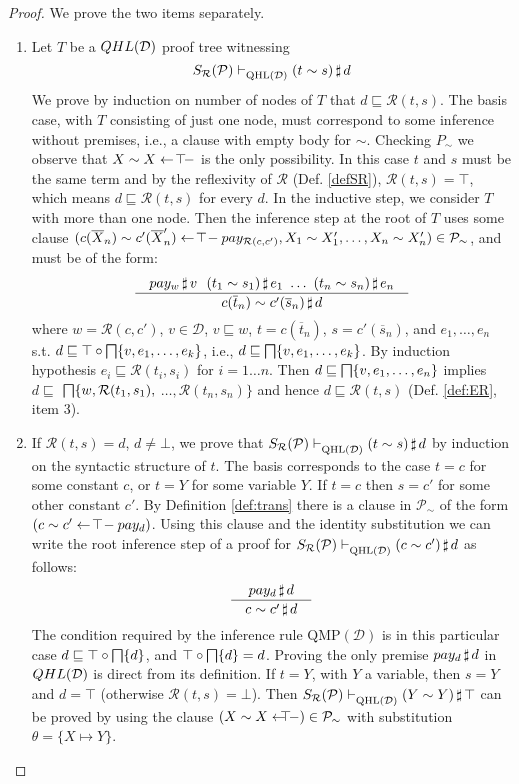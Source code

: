 \documentclass{sigplanconf}
\newcommand{\qdom}{\mathcal{D}} \newcommand{\dqdom}{D \setminus \{\bot\}} \newcommand{\bqdom}{(D \setminus \{\bot\}) \uplus \{?\}}
\newcommand{\simrel}{\mathcal{R}}
\newcommand{\trans}[2]{S_{#1}(#2)}
\newcommand{\Prog}{\mathcal{P}} \newcommand{\UProg}{\mathcal{P_U}}
\theoremstyle{definition}
\theoremstyle{plain}
\begin{document}
\begin{proof} We prove the two items separately.


\begin{enumerate}
    \item Let $T$ be a $\qhl{\qdom}$ proof tree witnessing $$\trans{\simrel}{\Prog} \qhld \at{(t \sim s)}{d}$$ We prove by induction on number of nodes of $T$ that $d \sqsubseteq  \simrel(t,s)$. The basis case, with $T$ consisting of just one node, must correspond to some inference without premises, i.e., a clause with empty body for $\sim$. Checking $P_\sim$ we observe that $X \sim X \gets\!\top\!-$ is the only possibility. In this case $t$ and $s$ must be the same term and by the reflexivity of $\simrel$ (Def. \ref{defSR}), $\simrel(t,s)= \top$, which means $d \sqsubseteq \simrel(t,s)$ for every $d$. In the inductive step, we consider $T$ with more than one node. Then the inference step at the root of $T$ uses some clause $(c(\overline{X}_n) \sim c'(\overline{X}'_n) \qgets{\top}pay_{\simrel(c,c')}, X_1 \sim X'_1, \dots, X_n \sim X'_n) \in \Prog_\sim$, and must be of the form:
        \[ \frac
            {\quad \at{pay_w}{v}\ \ \at{(t_1 \sim s_1)}{e_1}\ \dots \ \at{(t_n \sim s_n)}{e_n} \quad}
            {\at{c(\overline{t}_n) \sim c'(\overline{s}_n)}{d}}
        \]
        where $w=\simrel(c,c')$, $v\in \qdom$, $v \sqsubseteq w$, $t = c(\overline{t}_n)$, $s=c'(\overline{s}_n)$, and $e_1, \dots, e_n$ s.t. $d \sqsubseteq \top \circ \bigsqcap \{v, e_1, \ldots, e_k\}$, i.e., $d \sqsubseteq \bigsqcap\{v, e_1, \ldots, e_k\}$. By induction hypothesis $e_i \sqsubseteq \simrel(t_i,s_i)$ for $i=1 \dots n$. Then $d \sqsubseteq \bigsqcap \{v, e_1, \ldots, e_n\}$ implies $d \sqsubseteq$ $\infi \{w, \simrel(t_1,s_1),$ $\ldots, \simrel(t_n,s_n)\}$ and hence $d \sqsubseteq \simrel(t,s)$ (Def. \ref{def:ER}, item 3).

    \item If $\simrel(t,s) = d$, $d \neq \bot$, we prove that $\trans{\simrel}{\Prog} \qhld \at{(t \sim s)}{d}$ by  induction on the syntactic structure of $t$. The basis corresponds to the case $t = c$ for some constant $c$, or $t=Y$ for some variable $Y$. If $t=c$ then $s=c'$ for some other constant $c'$. By Definition \ref{def:trans} there is a clause in $\Prog_\sim$ of the form $(c \sim c' \gets\!\top\!- pay_{d})$. Using this clause and the identity substitution we can write the root inference step of a proof for $\trans{\simrel}{\Prog} \qhld\at{(c \sim c')}{d}$ as follows:
        \[ \frac
            {pay_d\,\sharp\,d}
            {\quad c \sim c'\,\sharp\,d \quad}
        \]
        The condition required by the inference rule $\mbox{QMP}(\qdom)$ is in this particular case $d \sqsubseteq \top \circ \bigsqcap \{ d \}$, and $\top \circ \bigsqcap \{ d \}=d$. Proving the only premise $pay_d\,\sharp\,d$  in $\qhl{\qdom}$ is direct from its definition. If $t=Y$, with $Y$ a variable, then $s=Y$ and $d=\top$ (otherwise $\simrel(t,s) = \bot$). Then $\trans{\simrel}{\Prog} \qhld \at{(Y \sim Y)}{\top}$ can be proved by using the clause $(X \sim X \qgets{\!\!\!\top}) \in \Prog_\sim$ with substitution $\theta=\{ X \mapsto Y \}$.


\end{enumerate}
\end{proof}
\end{document}
